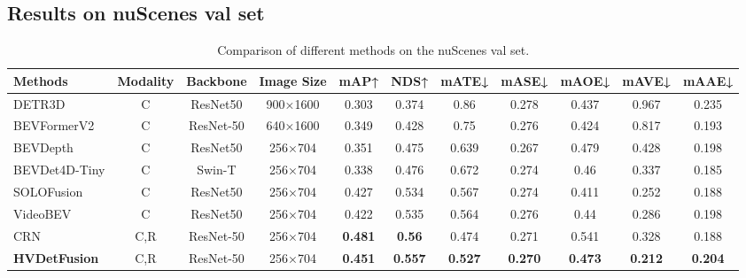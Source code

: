 \documentclass[10pt,twocolumn,letterpaper]{article}
\begin{document}
\subsection{Results on nuScenes val set}
\begin{table*}[h]\footnotesize
  \centering
  \vspace{0em} 
  \setlength{\tabcolsep}{1mm}
  \begin{tabular}{@{}lcccccccccc@{}}
    \hline
    Methods & Modality & Backbone      & Image Size & mAP↑  & NDS↑           & mATE↓ & mASE↓ & mAOE↓ & mAVE↓ & mAAE↓ \\ \hline
    {DETR3D}        & C        & ResNet50        & 900×1600   & 0.303 & 0.374          & 0.86  & 0.278 & 0.437 & 0.967 & 0.235 \\
    {BEVFormerV2}   & C        & ResNet-50       & 640×1600   & 0.349 & 0.428          & 0.75  & 0.276 & 0.424 & 0.817 & 0.193 \\
    {BEVDepth}      & C        & ResNet50        & 256×704    & 0.351 & 0.475          & 0.639 & 0.267 & 0.479 & 0.428 & 0.198 \\
    {BEVDet4D-Tiny} & C        & Swin-T          & 256×704    & 0.338 & 0.476          & 0.672 & 0.274 & 0.46  & 0.337 & 0.185 \\
    {SOLOFusion}    & C        & ResNet50        & 256×704    & 0.427 & 0.534          & 0.567 & 0.274 & 0.411 & 0.252 & 0.188 \\
    {VideoBEV}      & C        & ResNet50        & 256×704    & 0.422 & 0.535          & 0.564 & 0.276 & 0.44  & 0.286 & 0.198 \\
    {CRN}           & C,R      & ResNet-50       & 256×704    & \textbf{0.481} & \textbf{0.56}  & 0.474 & 0.271 & 0.541 & 0.328 & 0.188 \\
    \textbf{HVDetFusion} & C,R & ResNet-50   & 256×704    & \textbf{0.451} & \textbf{0.557} & \textbf{0.527} & \textbf{0.270} & \textbf{0.473} & \textbf{0.212} & \textbf{0.204} \\ 
    \hline
  \end{tabular}
  \caption{Comparison of different methods on the nuScenes val set.}
  \label{tab:contrast_net_score}
\end{table*}
\end{document}
